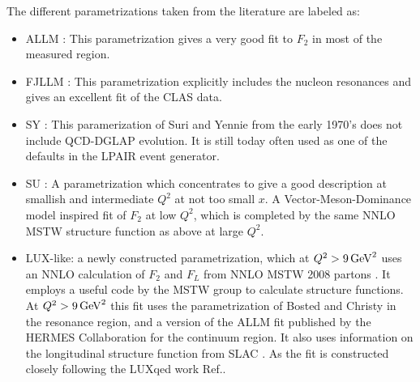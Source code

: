 The different parametrizations taken from the literature are labeled as:
\begin{itemize} 

 \item ALLM \cite{Abramowicz:1991xz,Abramowicz:1997ms}: This
   parametrization gives a very good fit to $F_2$ in most of the measured region.
   
\item FJLLM \cite{Fiore:2002re}: This parametrization explicitly
  includes the nucleon resonances and gives an excellent fit of the CLAS data.
  
\item SY \cite{Suri:1971yx}: This paramerization of Suri and Yennie
    from the early 1970's does not include QCD-DGLAP evolution. It is
    still today often used as one of the defaults in the LPAIR event generator.
    
\item SU \cite{Szczurek:1999rd}: A parametrization which concentrates
   to give a good description at smallish and intermediate $Q^2$ at not too small $x$.
   A Vector-Meson-Dominance model inspired fit of $F_2$ at low $Q^2$, which is completed by the same NNLO MSTW structure function as above at large $Q^2$.
   
\item LUX-like: a newly constructed parametrization, which at $Q^2 > 9 \, \rm{GeV}^2$ uses an NNLO calculation of $F_2$ and $F_L$ from NNLO MSTW 2008 partons \cite{Martin:2009iq}. 
It employs a useful code by the MSTW group \cite{Martin:2009iq} to calculate structure functions. At $Q^2 > 9 \, \rm{GeV}^2$ this fit uses the parametrization of Bosted and Christy \cite{Bosted:2007xd} in the resonance region, and a version of the ALLM fit published by the HERMES Collaboration \cite{Airapetian:2011nu} for the continuum
region. It also uses information on the longitudinal structure function from SLAC \cite{Abe:1998ym}. As the fit is constructed closely following
the LUXqed work Ref.\cite{Manohar:2017eqh}.
\end{itemize} 
	
